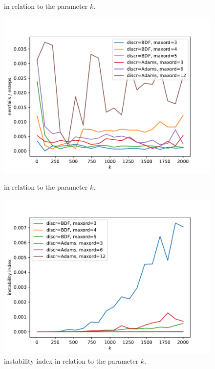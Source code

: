 \documentclass{report}
\begin{document}
\begin{figure}[h]
\begin{minipage}[b]{0.45\textwidth}
\caption{ in relation to the parameter $k$.}
\label{pl:njacs_nsteps1}
\end{minipage}
\end{figure}


\begin{figure}[h]
\centering
\begin{minipage}[b]{0.45\textwidth}
\centering
\includegraphics[width=\textwidth]{../Plots/Task4/Figure_212}
\caption{ in relation to the parameter $k$.}
\label{pl:nerrfails_nsteps1}
\end{minipage}
\hfill
\begin{minipage}[b]{0.45\textwidth}
\centering
\includegraphics[width=\textwidth]{../Plots/Task4/Figure_204}
\caption{instability index in relation to the parameter $k$.}
\label{pl:stability1}
\end{minipage}
\end{figure}
\end{document}
